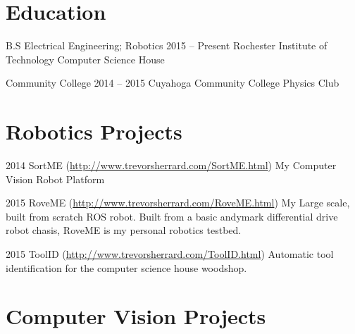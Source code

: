 \documentclass{tccv}
\begin{document}
\section{Education}

\begin{yearlist}

\item[B.S Electrical Engineering; Robotics]{2015 -- Present}
     {Rochester Institute of Technology}
     {Computer Science House}
     
\item[Community College]{2014 -- 2015}
     {Cuyahoga Community College}
     {Physics Club}
     

\end{yearlist}


\section{Robotics Projects}

\begin{yearlist}

\item{2014}
     {SortME (\href{http://www.trevorsherrard.com/SortME.html}{http://www.trevorsherrard.com\newline/SortME.html})}
     {My Computer Vision Robot Platform}
     
\item{2015}
     {RoveME (\href{http://www.trevorsherrard.com/RoveME.html}{http://www.trevorsherrard.com\newline/RoveME.html})}
     {My Large scale, built from scratch ROS robot. Built from a basic andymark differential drive robot chasis, RoveME is my personal robotics testbed.}
     
\item{2015}
	{ToolID (\href{http://www.trevorsherrard.com/ToolID.html}
	{http://www.trevorsherrard.com\newline/ToolID.html})}
	{Automatic tool identification for the computer science house woodshop. }
 

\end{yearlist}


\section{Computer Vision Projects}
\end{document}
